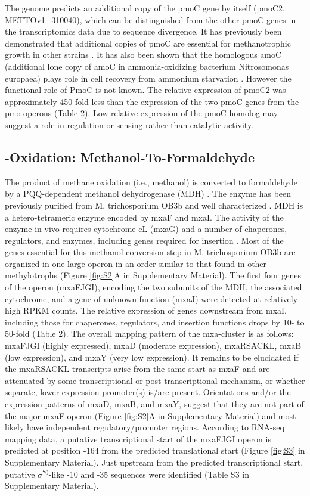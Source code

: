 The genome predicts an additional copy of the pmoC gene by itself (pmoC2, METTOv1\_310040), which can be distinguished from the other pmoC genes in the transcriptomics data due to sequence divergence.
It has previously been demonstrated that additional copies of pmoC are essential for methanotrophic growth in other strains \cite{stolyar1999, dam2012a}.
It has also been shown that the homologous amoC (additional lone copy of amoC in ammonia-oxidizing bacterium Nitrosomonas europaea) plays role in cell recovery from ammonium starvation \cite{berube2012}.
However the functional role of PmoC is not known.
The relative expression of pmoC2 was approximately 450-fold less than the expression of the two pmoC genes from the pmo-operons (Table 2).
Low relative expression of the pmoC homolog may suggest a role in regulation or sensing rather than catalytic activity.

\subsection{-Oxidation: Methanol-To-Formaldehyde}
The product of methane oxidation (i.e., methanol) is converted to formaldehyde by a PQQ-dependent methanol dehydrogenase (MDH) \cite{anthony1982, anthony2002, yamada1992, anthony1994}. %
The enzyme has been previously purified from M. trichosporium OB3b and well characterized \cite{yamada1992}.  %
MDH is a hetero-tetrameric enzyme encoded by mxaF and mxaI.
The activity of the enzyme in vivo requires cytochrome cL (mxaG) and a number of chaperones, regulators, and enzymes, including genes required for  insertion \cite{anthony1994, anthony2002}.
Most of the genes essential for this methanol conversion step in M. trichosporium OB3b are organized in one large operon in an order similar to that found in other methylotrophs (Figure \ref{fig:S2}A in Supplementary Material).
The first four genes of the operon (mxaFJGI), encoding the two subunits of the MDH, the associated cytochrome, and a gene of unknown function (mxaJ) were detected at relatively high RPKM counts.
The relative expression of genes downstream from mxaI, including those for chaperones, regulators, and  insertion functions drops by 10- to 50-fold (Table 2).
The overall mapping pattern of the mxa-cluster is as follows: mxaFJGI (highly expressed), mxaD (moderate expression), mxaRSACKL, mxaB (low expression), and mxaY (very low expression).
It remains to be elucidated if the mxaRSACKL transcripts arise from the same start as mxaF and are attenuated by some transcriptional or post-transcriptional mechanism, or whether separate, lower expression promoter(s) is/are present.
Orientations and/or the expression patterns of mxaD, mxaB, and mxaY, suggest that they are not part of the major mxaF-operon (Figure \ref{fig:S2}A in Supplementary Material) and most likely have independent regulatory/promoter regions.
According to RNA-seq mapping data, a putative transcriptional start of the mxaFJGI operon is predicted at position -164 from the predicted translational start (Figure \ref{fig:S3} in Supplementary Material).
Just upstream from the predicted transcriptional start, putative $\sigma^{70}$-like -10 and -35 sequences were identified (Table S3 in Supplementary Material).

